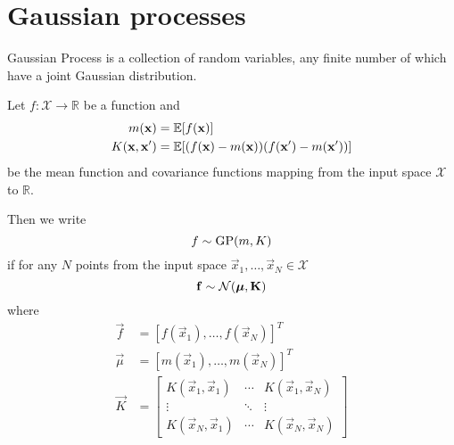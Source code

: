 \section{Gaussian processes}
Gaussian Process is a collection of random variables, any finite number of which have a joint Gaussian distribution.

Let $f: \mathcal X \to \mathbb R$ be a function and
\begin{align*}
	m(\boldsymbol{\mathbf{x}}) 			&= \operatorname{\mathbb{E}}[f(\boldsymbol{\mathbf{x}})] \\
	K(\boldsymbol{\mathbf{x}}, \boldsymbol{\mathbf{x}}')	&= \operatorname{\mathbb{E}}[(f(\boldsymbol{\mathbf{x}}) - m(\boldsymbol{\mathbf{x}}))(f(\boldsymbol{\mathbf{x}}') - m(\boldsymbol{\mathbf{x}}'))]
\end{align*}
be the mean function and covariance functions mapping from the input space $\mathcal X$ to $\mathbb R$.

Then we write
\begin{equation*}
	f \sim \operatorname{GP}(m, K)
\end{equation*}
if for any $N$ points from the input space $\vec x_1, \dotsc, \vec x_N \in \mathcal X$
\begin{equation*}
	\boldsymbol{\mathbf{f}} 	\sim \operatorname{\mathcal N}(\boldsymbol{\mathbf{\mu}}, \boldsymbol{\mathbf{K}})
\end{equation*}
where
\begin{align*}
	\vec f 		&= [f(\vec x_1), \dotsc, f(\vec x_N)]^T \\
	\vec \mu 	&= [m(\vec x_1), \dotsc, m(\vec x_N)]^T \\
	\vec K 		&=
		\begin{bmatrix}
			K(\vec x_1, \vec x_1) 	& \cdots & K(\vec x_1, \vec x_N) \\
			\vdots 					& \ddots & \vdots \\
			K(\vec x_N, \vec x_1) 	& \cdots & K(\vec x_N, \vec x_N)
		\end{bmatrix}
\end{align*}

